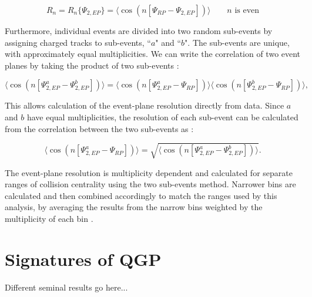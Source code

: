\begin{equation}
	R_n = R_n\{\Psi_{2, EP}\} = \langle \cos(n[\Psi_{RP} - \Psi_{2, EP}]) \rangle \qquad \text{$n$ is even}
	\label{resolution}
\end{equation}

Furthermore, individual events are divided into two random sub-events by assigning charged tracks to sub-events, ``$a$" and ``$b$". The sub-events are unique, with approximately equal multiplicities. We can write the correlation of two event planes by taking the product of two sub-events \cite{Barrette:1996rs,Poskanzer:1998yz}:

\begin{equation}
	\langle \cos(n[\Psi_{2, EP}^{a} - \Psi_{2, EP}^{b}]) \rangle = 
	\langle \cos(n[\Psi_{2, EP}^{a} - \Psi_{RP}]) \rangle
	\langle \cos(n[\Psi_{2, EP}^{b} - \Psi_{RP}]) \rangle,
	\label{resolution2sub}
\end{equation}

\noindent This allows calculation of the event-plane resolution directly from data. Since $a$ and $b$ have equal multiplicities, the resolution of each sub-event can be calculated from the correlation between the two sub-events as \cite{Poskanzer:1998yz}:

\begin{equation}
	\langle \cos(n[\Psi_{2, EP}^{a} - \Psi_{RP}]) \rangle = 
	\sqrt{\langle \cos(n[\Psi_{2, EP}^{a} - \Psi_{2, EP}^{b}]) \rangle} .
	\label{resolutionIndiv}
\end{equation}

The event-plane resolution is multiplicity dependent and calculated for separate ranges of collision centrality using the two sub-events method.  Narrower bins are calculated and then combined accordingly to match the ranges used by this analysis, by averaging the results from the narrow bins weighted by the multiplicity of each bin \cite{Voloshin:2008dg}.


\section{Signatures of QGP}
Different seminal results go here...
